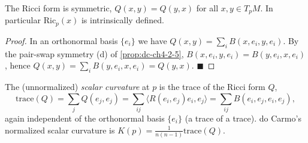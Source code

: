 \begin{proposition}
  \label{prop:dc-ch4-4-ricci-symm}
  \leanok
  The Ricci form is symmetric, $Q(x,y)=Q(y,x)$ for all $x,y\in T_pM$. In
  particular $\mathrm{Ric}_p(x)$ is intrinsically defined.
\end{proposition}
\begin{proof}
  \leanok
  In an orthonormal basis $\{e_i\}$ we have $Q(x,y)=\sum_i B(x,e_i,y,e_i)$. By the
  pair-swap symmetry (d) of \cref{prop:dc-ch4-2-5}, $B(x,e_i,y,e_i)=B(y,e_i,x,e_i)$,
  hence $Q(x,y)=\sum_i B(y,e_i,x,e_i)=Q(y,x)$. $\blacksquare$
\end{proof}

\begin{definition}
  \label{def:dc-ch4-4-scalar}
  \leanok
  The (unnormalized) \emph{scalar curvature} at $p$ is the trace of the Ricci
  form $Q$,
  $$
  \mathrm{trace}(Q)=\sum_j Q(e_j,e_j)=\sum_{ij}\langle R(e_i,e_j)e_i,e_j\rangle
    =\sum_{ij}B(e_i,e_j,e_i,e_j),
  $$
  again independent of the orthonormal basis $\{e_i\}$ (a trace of a trace). do
  Carmo's normalized scalar curvature is $K(p)=\frac{1}{n(n-1)}\mathrm{trace}(Q)$.
\end{definition}

